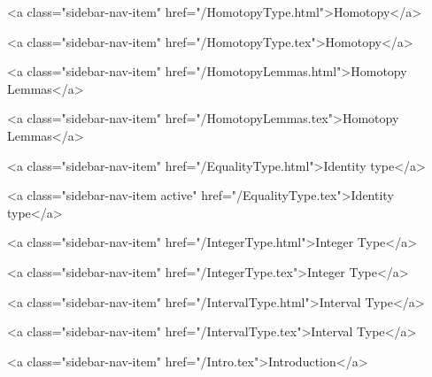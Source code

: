       
    
      
        
          <a class="sidebar-nav-item" href="/HomotopyType.html">Homotopy</a>
        
      
    
      
        
          <a class="sidebar-nav-item" href="/HomotopyType.tex">Homotopy</a>
        
      
    
      
        
          <a class="sidebar-nav-item" href="/HomotopyLemmas.html">Homotopy Lemmas</a>
        
      
    
      
        
          <a class="sidebar-nav-item" href="/HomotopyLemmas.tex">Homotopy Lemmas</a>
        
      
    
      
        
          <a class="sidebar-nav-item" href="/EqualityType.html">Identity type</a>
        
      
    
      
        
          <a class="sidebar-nav-item active" href="/EqualityType.tex">Identity type</a>
        
      
    
      
        
          <a class="sidebar-nav-item" href="/IntegerType.html">Integer Type</a>
        
      
    
      
        
          <a class="sidebar-nav-item" href="/IntegerType.tex">Integer Type</a>
        
      
    
      
        
          <a class="sidebar-nav-item" href="/IntervalType.html">Interval Type</a>
        
      
    
      
        
          <a class="sidebar-nav-item" href="/IntervalType.tex">Interval Type</a>
        
      
    
      
        
          <a class="sidebar-nav-item" href="/Intro.tex">Introduction</a>
        
